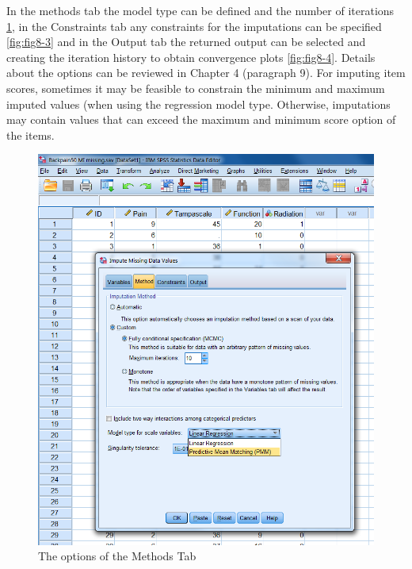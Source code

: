\documentclass[
]{book}
\begin{document}
In the methods tab the model type can be defined and the number of iterations \ref{fig:fig8-2}, in the Constraints tab any constraints for the imputations can be specified \ref{fig:fig8-3} and in the Output tab the returned output can be selected and creating the iteration history to obtain convergence plots \ref{fig:fig8-4}. Details about the options can be reviewed in Chapter 4 (paragraph 9). For imputing item scores, sometimes it may be feasible to constrain the minimum and maximum imputed values (when using the regression model type. Otherwise, imputations may contain values that can exceed the maximum and minimum score option of the items.

\begin{figure}

{\centering \includegraphics[width=0.9\linewidth]{images/fig8.2} 

}

\caption{The options of the Methods Tab}\label{fig:fig8-2}
\end{figure}
\end{document}
